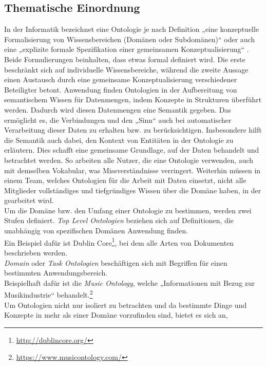 \subsection{Thematische Einordnung}
In der Informatik bezeichnet eine Ontologie je nach Definition „eine
konzeptuelle Formalisierung von Wissensbereichen (Domänen oder Subdomänen)“
\cite{Bie02} oder auch eine „explizite formale Spezifikation einer gemeinsamen
Konzeptualisierung“ \cite{Hes02}.\\
Beide Formulierungen beinhalten, dass etwas
formal definiert wird. Die erste beschränkt sich auf individuelle
Wissensbereiche, während die zweite Aussage einen Austausch durch eine
gemeinsame Konzeptualisierung verschiedener Beteiligter betont. Anwendung finden
Ontologien in der Aufbereitung von semantischem Wissen für Datenmengen, indem
Konzepte in Strukturen überführt werden. Dadurch wird diesen Datenmengen eine
Semantik gegeben. Das ermöglicht es, die Verbindungen und den „Sinn“ auch bei
automatischer Verarbeitung dieser Daten zu erhalten bzw. zu berücksichtigen.
Insbesondere hilft die Semantik auch dabei, den Kontext von Entitäten in der
Ontologie zu erläutern.\cite{Bie02} Dies schafft eine gemeinsame Grundlage, auf
der Daten behandelt und betrachtet werden. So arbeiten alle Nutzer, die eine
Ontologie verwenden, auch mit demselben Vokabular, was Missverständnisse
verringert. Weiterhin müssen in einem Team, welches Ontologien für die Arbeit
mit Daten einsetzt, nicht alle Mitglieder vollständiges und tiefgründiges Wissen
über die Domäne haben, in der gearbeitet wird.\\
Um die Domäne bzw. den Umfang einer Ontologie zu bestimmen, werden zwei Stufen
definiert. \textit{Top Level Ontologien} beziehen sich auf Definitionen, die
unabhängig von spezifischen Domänen Anwendung finden. \cite{Bie02} 
\cite{Hes02}\\
Ein Beispiel dafür ist Dublin
Core\footnote{\url{http://dublincore.org/}}, bei dem alle Arten von Dokumenten
beschrieben werden.\\
\textit{Domain} oder \textit{Task Ontologien} beschäftigen sich mit Begriffen
für einen bestimmten Anwendungsbereich. \cite{Bie02}  \cite{Hes02}\\
Beispielhaft dafür ist die \textit{Music Ontology}, welche „Informationen mit
Bezug zur Musikindustrie“
behandelt.\footnote{\url{https://www.musicontology.com/}}\\
Um Ontologien nicht nur isoliert zu betrachten und da bestimmte Dinge und
Konzepte in mehr als einer Domäne vorzufinden sind, bietet es sich an,
